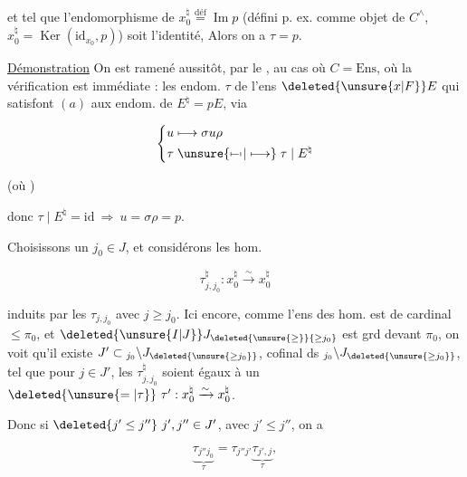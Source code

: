 et tel que l'endomorphisme de $x_0^\natural\overset{\mathrm{déf}}{=}\operatorname{Im}p$ (défini p. ex. comme objet de $C^\wedge$, $x_0^\natural=\operatorname{Ker}(\mathrm{id}_{x_0},p)$) soit l'identité, Alors on a $\tau=p$.

\uline{Démonstration}  On est ramené aussitôt, par le  , au cas où $C=\mathrm{Ens}$, où la vérification est immédiate : les endom. $\tau$ de l'ens $\deleted{\unsure{x|F}}E$  qui satisfont $(a)$   aux  endom. de $E^\natural=pE$, via

\[\left\{\begin{aligned}u&\longmapsto\sigma u\rho\\ \tau&\mathrel{\unsure{\mapstochar\relbar\mapstochar|\longmapsto}}\tau\mid E^\natural\end{aligned}\right.\]

(où  )

donc $\tau\mid E^\natural=\mathrm{id}\ \Longrightarrow\ u=\sigma\rho=p$.

Choisissons un $j_0\in J$, et considérons les hom.

\[\tau_{j,j_0}^\natural:x_0^\natural\xrightarrow{\sim}x_0^\natural\]

induits par les $\tau_{j,j_0}$ avec $j\geq j_0$. Ici encore, comme l'ens des hom.  est de
%
%
cardinal $\leq\pi_0$, et $\deleted{\unsure{I|J}}J_{\deleted{\unsure{\geq}}{\geq j_0}}$ est grd devant $\pi_0$, on voit qu'il existe $J'\subset{}_{j_0}\backslash J_{\deleted{\unsure{\geq j_0}}}$, cofinal ds $\mathord{}_{j_0}\backslash J_{\deleted{\unsure{\geq j_0}}}$, tel que pour $j\in J'$, les $\tau_{j,j_0}^\natural$ soient égaux à un $\deleted{\unsure{=|\tau}}\ \tau':x_0^\natural\xrightarrow{\sim}x_0^\natural$.

Donc si $\deleted{j'\leq j''}\ j',j''\in J'$, avec $j'\leq j''$, on a

\[\underbrace{\tau_{j''j_0}}_{\tau}=\tau_{j''j'}\underbrace{\tau_{j',j}}_{\tau},\]

